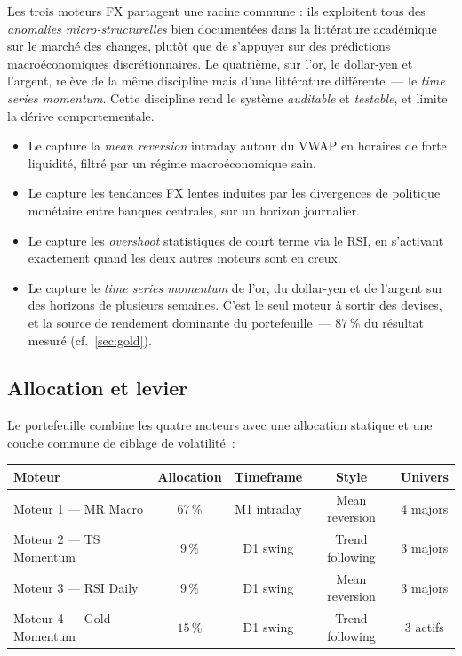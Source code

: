 \documentclass[11pt, a4paper]{scrartcl}
\begin{document}
Les trois moteurs FX partagent une racine commune : ils exploitent tous des \emph{anomalies micro-structurelles} bien documentées dans la littérature académique sur le marché des changes, plutôt que de s'appuyer sur des prédictions macroéconomiques discrétionnaires. Le quatrième, sur l'or, le dollar-yen et l'argent, relève de la même discipline mais d'une littérature différente~--- le \emph{time series momentum}. Cette discipline rend le système \emph{auditable} et \emph{testable}, et limite la dérive comportementale.

\begin{itemize}
\item Le  capture la \emph{mean reversion} intraday autour du VWAP en horaires de forte liquidité, filtré par un régime macroéconomique sain.
\item Le  capture les tendances FX lentes induites par les divergences de politique monétaire entre banques centrales, sur un horizon journalier.
\item Le  capture les \emph{overshoot} statistiques de court terme via le RSI, en s'activant exactement quand les deux autres moteurs sont en creux.
\item Le  capture le \emph{time series momentum} de l'or, du dollar-yen et de l'argent sur des horizons de plusieurs semaines. C'est le seul moteur à sortir des devises, et la source de rendement dominante du portefeuille~--- $87\,\%$ du résultat mesuré (cf.~\ref{sec:gold}).
\end{itemize}

\subsection{Allocation et levier}

Le portefeuille combine les quatre moteurs avec une allocation statique et une couche commune de ciblage de volatilité~:

\begin{center}
\renewcommand{\arraystretch}{1.2}
\begin{tabular}{lcccc}
\toprule
\textbf{Moteur} & \textbf{Allocation} & \textbf{Timeframe} & \textbf{Style} & \textbf{Univers} \\
\midrule
\rowcolor{softBlue} Moteur 1 --- MR Macro & $67\,\%$ & M1 intraday & Mean reversion & 4 majors \\
\rowcolor{softYellow} Moteur 2 --- TS Momentum & $9\,\%$ & D1 swing & Trend following & 3 majors \\
\rowcolor{softGreen} Moteur 3 --- RSI Daily & $9\,\%$ & D1 swing & Mean reversion & 3 majors \\
\rowcolor{lightGrey} Moteur 4 --- Gold Momentum & $15\,\%$ & D1 swing & Trend following & 3 actifs \\
\bottomrule
\end{tabular}
\end{center}
\end{document}
